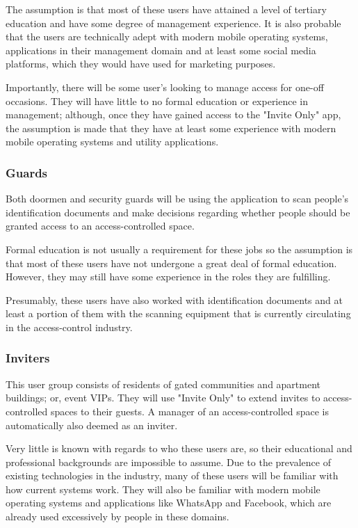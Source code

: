 The assumption is that most of these users have attained a level of tertiary education and have some degree of management experience. It is also probable that the users are technically adept with modern mobile operating systems, applications in their management domain and at least some social media platforms, which they would have used for marketing purposes.

Importantly, there will be some user's looking to manage access for one-off occasions. They will have little to no formal education or experience in  management; although, once they have gained access to the "Invite Only" app, the assumption is made that they have at least some experience with modern mobile operating systems and utility applications.

\subsubsection{Guards}
Both doormen and security guards will be using the application to scan people's identification documents and make decisions regarding whether people should be granted access to an access-controlled space.

Formal education is not usually a requirement for these jobs so the assumption is that most of these users have not undergone a great deal of formal education. However, they may still have some experience in the roles they are fulfilling.

Presumably, these users have also worked with identification documents and at least a portion of them with the scanning equipment that is currently circulating in the access-control industry.
\newpage
\subsubsection{Inviters}
This user group consists of residents of gated communities and apartment buildings; or, event VIPs. They will use "Invite Only" to extend invites to access-controlled spaces to their guests. A manager of an access-controlled space is automatically also deemed as an inviter.

Very little is known with regards to who these users are, so their educational and professional backgrounds are impossible to assume. 
Due to the prevalence of existing technologies in the industry, many of these users will be familiar with how current systems work. They will also be familiar with modern mobile operating systems and applications like WhatsApp and Facebook, which are already used excessively by people in these domains.

